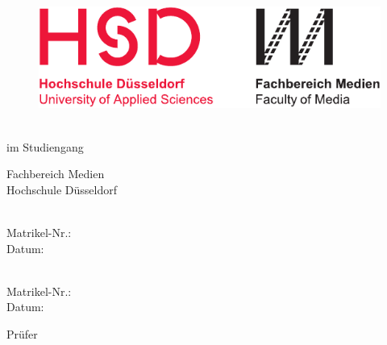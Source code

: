 \thispagestyle{empty}

\begin{figure}
  \flushleft %
  \includegraphics[width=.5\textwidth]{figures/hsd_m_logo.pdf}
\end{figure}

\vspace*{12ex}

\hfill
\begin{minipage}{.8\textwidth}
  \begin{flushright}
    
    {\Huge\bfseries\DocumentThesisTitle\par}
    
    \vspace*{2ex}		
    
    {\large\DocumentThesisSubtitle}
    
    \vspace*{12ex}
    
    \onehalfspacing
    
    \textbf{\DocumentThesisType}\\
    \vspace*{1ex}
    im Studiengang \DocumentThesisCourse\\
    
    \vspace*{8ex}
    
    Fachbereich Medien\\
    Hochschule Düsseldorf
    
    \vspace*{12ex}
    
    \DocumentAuthorPrename\ \DocumentAuthorName\\
    Matrikel-Nr.: \DocumentThesisMatr\\
    Datum: \DocumentThesisDateCover
    
    \vspace*{1cm}
    
    \DocumentSecondAuthorPrename\ \DocumentSecondAuthorName\\
    Matrikel-Nr.: \DocumentSecondThesisMatr\\
    Datum: \DocumentThesisDateCover
    
    \vspace*{12ex}
    
    Prüfer\\
    \vspace*{1ex}
    \DocumentThesisFirstExaminer
    
  \end{flushright}
\end{minipage}